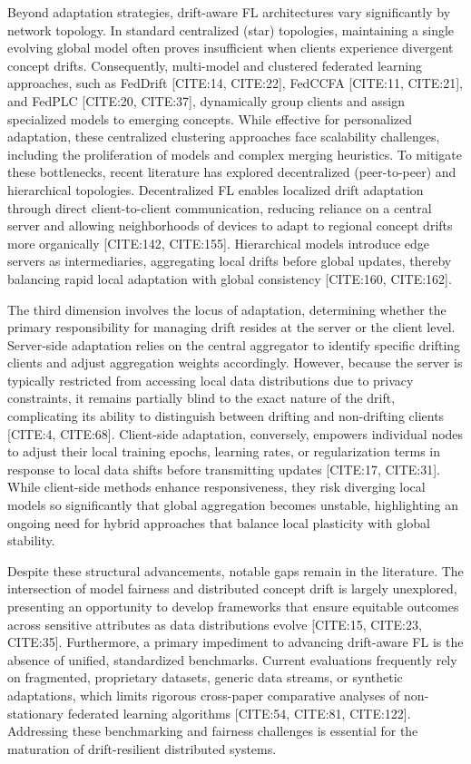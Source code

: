 \documentclass[journal]{IEEEtran}
\begin{document}
Beyond adaptation strategies, drift-aware FL architectures vary significantly by network topology. In standard centralized (star) topologies, maintaining a single evolving global model often proves insufficient when clients experience divergent concept drifts. Consequently, multi-model and clustered federated learning approaches, such as FedDrift [CITE:14, CITE:22], FedCCFA [CITE:11, CITE:21], and FedPLC [CITE:20, CITE:37], dynamically group clients and assign specialized models to emerging concepts. While effective for personalized adaptation, these centralized clustering approaches face scalability challenges, including the proliferation of models and complex merging heuristics. To mitigate these bottlenecks, recent literature has explored decentralized (peer-to-peer) and hierarchical topologies. Decentralized FL enables localized drift adaptation through direct client-to-client communication, reducing reliance on a central server and allowing neighborhoods of devices to adapt to regional concept drifts more organically [CITE:142, CITE:155]. Hierarchical models introduce edge servers as intermediaries, aggregating local drifts before global updates, thereby balancing rapid local adaptation with global consistency [CITE:160, CITE:162].

The third dimension involves the locus of adaptation, determining whether the primary responsibility for managing drift resides at the server or the client level. Server-side adaptation relies on the central aggregator to identify specific drifting clients and adjust aggregation weights accordingly. However, because the server is typically restricted from accessing local data distributions due to privacy constraints, it remains partially blind to the exact nature of the drift, complicating its ability to distinguish between drifting and non-drifting clients [CITE:4, CITE:68]. Client-side adaptation, conversely, empowers individual nodes to adjust their local training epochs, learning rates, or regularization terms in response to local data shifts before transmitting updates [CITE:17, CITE:31]. While client-side methods enhance responsiveness, they risk diverging local models so significantly that global aggregation becomes unstable, highlighting an ongoing need for hybrid approaches that balance local plasticity with global stability.

Despite these structural advancements, notable gaps remain in the literature. The intersection of model fairness and distributed concept drift is largely unexplored, presenting an opportunity to develop frameworks that ensure equitable outcomes across sensitive attributes as data distributions evolve [CITE:15, CITE:23, CITE:35]. Furthermore, a primary impediment to advancing drift-aware FL is the absence of unified, standardized benchmarks. Current evaluations frequently rely on fragmented, proprietary datasets, generic data streams, or synthetic adaptations, which limits rigorous cross-paper comparative analyses of non-stationary federated learning algorithms [CITE:54, CITE:81, CITE:122]. Addressing these benchmarking and fairness challenges is essential for the maturation of drift-resilient distributed systems.
\end{document}
